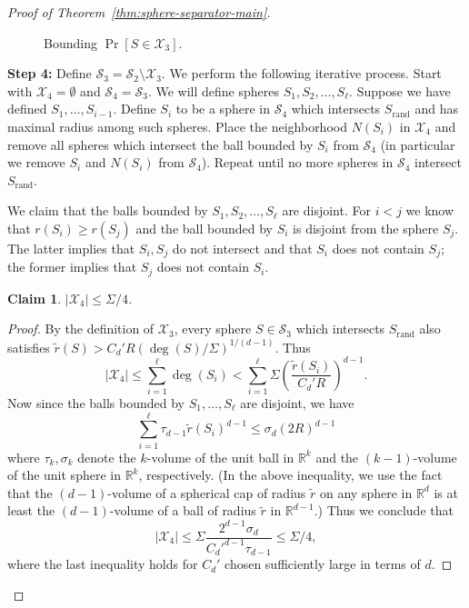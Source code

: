 \documentclass[10pt,a4paper]{amsart}
\newtheorem{claim}{Claim}
\newcommand{\R}{\mathbb R}
\newcommand{\fS}{\mathcal S}
\newcommand{\fX}{\mathcal X}
\newcommand{\paren}[1]{\left( #1 \right)}
\begin{document}
\begin{proof}[Proof of Theorem~\ref{thm:sphere-separator-main}]
\begin{figure}
\caption{\label{fig:expected-x3-size}
Bounding $\Pr[S\in\fX_3]$.}
\end{figure}

\vspace{5pt} \noindent \textbf{Step 4:} Define $\fS_3=\fS_2\setminus \fX_3$. We perform the following iterative process. Start with $\fX_4=\emptyset$ and $\fS_4=\fS_3$. We will define spheres $S_1,S_2,\ldots,S_\ell$. Suppose we have defined $S_1,\ldots, S_{i-1}$. Define $S_i$ to be a sphere in $\fS_4$ which intersects $S_{\mathrm{rand}}$ and has maximal radius among such spheres. Place the neighborhood $N(S_i)$ in $\fX_4$ and remove all spheres which intersect the ball bounded by $S_i$ from $\fS_4$ (in particular we remove $S_i$ and $N(S_i)$ from $\fS_4$). Repeat until no more spheres in $\fS_4$ intersect $S_{\mathrm{rand}}$.

We claim that the balls bounded by $S_1,S_2,\ldots,S_\ell$ are disjoint. For $i<j$ we know that $r(S_i)\geq r(S_j)$ and the ball bounded by $S_i$ is disjoint from the sphere $S_j$. The latter implies that $S_i,S_j$ do not intersect and that $S_i$ does not contain $S_j$; the former implies that $S_j$ does not contain $S_i$. 

\begin{claim}
\label{claim:x4-size}
$|\fX_4|\leq\Sigma/4$.
\end{claim}
\begin{proof}
By the definition of $\fX_3$, every sphere $S\in\fS_3$ which intersects $S_{\mathrm{rand}}$ also satisfies $\tilde r(S)>C_d'R(\deg(S)/\Sigma)^{1/(d-1)}$. Thus
\[|\fX_4|\leq\sum_{i=1}^\ell\deg(S_i)<\sum_{i=1}^\ell\Sigma\paren{\frac{\tilde r(S_i)}{C_d' R}}^{d-1}.\]
Now since the balls bounded by $S_1,\ldots,S_\ell$ are disjoint, we have
\[\sum_{i=1}^\ell \tau_{d-1}\tilde r(S_i)^{d-1}\leq \sigma_d (2R)^{d-1}\]
where $\tau_k,\sigma_k$ denote the $k$-volume of the unit ball in $\R^k$ and the $(k-1)$-volume of the unit sphere in $\R^k$, respectively. (In the above inequality, we use the fact that the $(d-1)$-volume of a spherical cap of radius $\tilde r$ on any sphere in $\R^d$ is at least the $(d-1)$-volume of a ball of radius $\tilde r$ in $\R^{d-1}$.) Thus we conclude that
\[|\fX_4|\leq \Sigma \frac{2^{d-1}\sigma_d}{C_d'^{d-1}\tau_{d-1}}\leq\Sigma/4,\]
where the last inequality holds for $C_d'$ chosen sufficiently large in terms of $d$.
\end{proof}


\end{proof}
\end{document}
